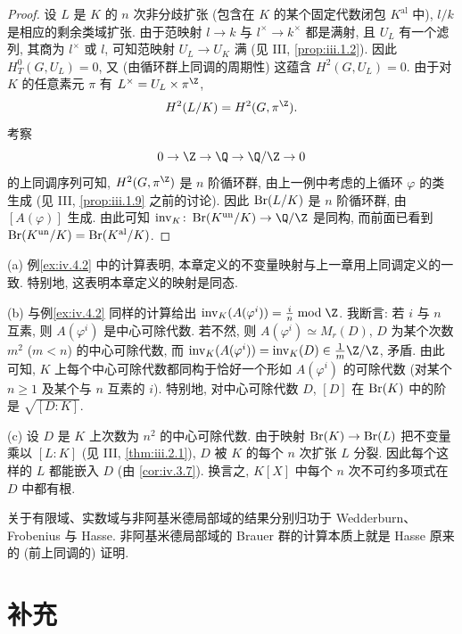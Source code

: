 \begin{proof}
设 $L$ 是 $K$ 的 $n$ 次非分歧扩张 (包含在 $K$ 的某个固定代数闭包 $K^{\mathrm{al}}$ 中), $l/k$ 是相应的剩余类域扩张. 由于范映射 $l\to k$ 与 $l^{\times}\to k^{\times}$ 都是满射, 且 $U_L$ 有一个滤列, 其商为 $l^{\times}$ 或 $l$, 可知范映射 $U_L\to U_K$ 满 (见 III, \ref{prop:iii.1.2}). 因此 $H_T^0(G,U_L)=0$, 又 (由循环群上同调的周期性) 这蕴含 $H^2(G,U_L)=0$. 由于对 $K$ 的任意素元 $\pi$ 有 $L^{\times}=U_L\times\pi^{\Z}$,
\[
H^{2}(L/K)=H^{2}(G,\pi^{\Z}).
\]
考察
\[
0\to\Z\to\Q\to\Q/\Z\to0
\]
的上同调序列可知, $H^2(G,\pi^{\Z})$ 是 $n$ 阶循环群, 由上一例中考虑的上循环 $\varphi$ 的类生成 (见 III, \ref{prop:iii.1.9} 之前的讨论). 因此 $\operatorname{Br}(L/K)$ 是 $n$ 阶循环群, 由 $[A(\varphi)]$ 生成. 由此可知 $\operatorname{inv}_K\colon\Br(K^{\mathrm{un}}/K)\to\Q/\Z$ 是同构, 而前面已看到 $\operatorname{Br}(K^{\mathrm{un}}/K)=\operatorname{Br}(K^{\mathrm{al}}/K)$.
\end{proof}

\begin{remark}\label{rem:iv.4.4}
(a) 例\ref{ex:iv.4.2} 中的计算表明, 本章定义的不变量映射与上一章用上同调定义的一致. 特别地, 这表明本章定义的映射是同态.

(b) 与例\ref{ex:iv.4.2} 同样的计算给出 $\operatorname{inv}_K(A(\varphi^i))=\frac{i}{n}\bmod\Z$. 我断言: 若 $i$ 与 $n$ 互素, 则 $A(\varphi^i)$ 是中心可除代数. 若不然, 则 $A(\varphi^i)\simeq M_r(D)$, $D$ 为某个次数 $m^2$ ($m<n$) 的中心可除代数, 而 $\operatorname{inv}_K(A(\varphi^i))=\operatorname{inv}_K(D)\in\frac{1}{m}\Z/\Z$, 矛盾. 由此可知, $K$ 上每个中心可除代数都同构于恰好一个形如 $A(\varphi^i)$ 的可除代数 (对某个 $n\ge 1$ 及某个与 $n$ 互素的 $i$). 特别地, 对中心可除代数 $D$, $[D]$ 在 $\operatorname{Br}(K)$ 中的阶是 $\sqrt{[D:K]}$.

(c) 设 $D$ 是 $K$ 上次数为 $n^2$ 的中心可除代数. 由于映射 $\operatorname{Br}(K)\to\operatorname{Br}(L)$ 把不变量乘以 $[L:K]$ (见 III, \ref{thm:iii.2.1}), $D$ 被 $K$ 的每个 $n$ 次扩张 $L$ 分裂. 因此每个这样的 $L$ 都能嵌入 $D$ (由 \ref{cor:iv.3.7}). 换言之, $K[X]$ 中每个 $n$ 次不可约多项式在 $D$ 中都有根.
\end{remark}

\begin{NOTES}\label{note:iv.4}
关于有限域、实数域与非阿基米德局部域的结果分别归功于 Wedderburn、Frobenius 与 Hasse. 非阿基米德局部域的 Brauer 群的计算本质上就是 Hasse 原来的 (前上同调的) 证明.
\end{NOTES}

\section{补充}\label{sec:IV.5}

